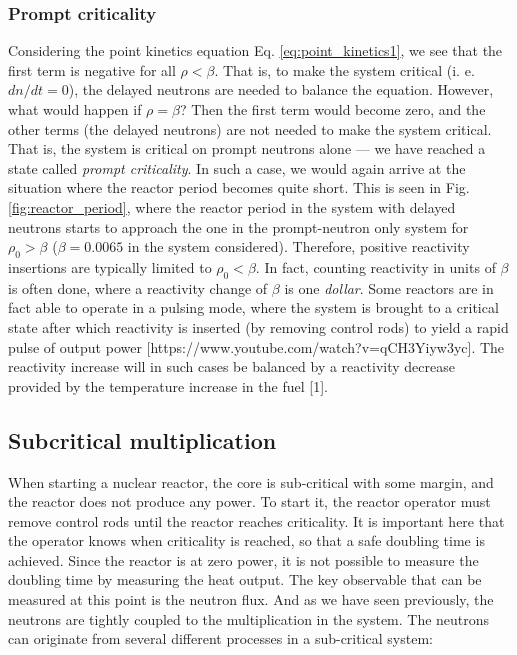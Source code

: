 \subsubsection*{Prompt criticality}
Considering the point kinetics equation Eq. \ref{eq:point_kinetics1}, we see that the first term is negative for all $\rho < \beta$. That is, to make the system critical (i. e. $dn/dt = 0$), the delayed neutrons are needed to balance the equation. However, what would happen if $\rho = \beta$? Then the first term would become zero, and the other terms (the delayed neutrons) are not needed to make the system critical. That is, the system is critical on prompt neutrons alone --- we have reached a state called \emph{prompt criticality}. In such a case, we would again arrive at the situation where the reactor period becomes quite short. This is seen in Fig. \ref{fig:reactor_period}, where the reactor period in the system with delayed neutrons starts to approach the one in the prompt-neutron only system for $\rho_0 > \beta$ ($\beta = 0.0065$ in the system considered). Therefore, positive reactivity insertions are typically limited to $\rho_0 < \beta$. In fact, counting reactivity in units of $\beta$ is often done, where a reactivity change of $\beta$ is one \emph{dollar}. Some reactors are in fact able to operate in a pulsing mode, where the system is brought to a critical state after which reactivity is inserted (by removing control rods) to yield a rapid pulse of output power [https://www.youtube.com/watch?v=qCH3Yiyw3yc]. The reactivity increase will in such cases be balanced by a reactivity decrease provided by the temperature increase in the fuel [1].







\subsection{Subcritical multiplication}
When starting a nuclear reactor, the core is sub-critical with some margin, and the reactor does not produce any power. To start it, the reactor operator must remove control rods until the reactor reaches criticality. It is important here that the operator knows when criticality is reached, so that a safe doubling time is achieved. Since the reactor is at zero power, it is not possible to measure the doubling time by measuring the heat output. The key observable that can be measured at this point is the neutron flux. And as we have seen previously, the neutrons are tightly coupled to the multiplication in the system. The neutrons can originate from several different processes in a sub-critical system:

